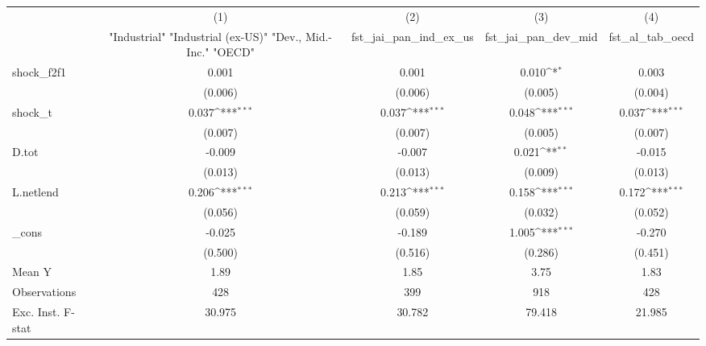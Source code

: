 {
\def\sym#1{\ifmmode^{#1}\else\(^{#1}\)\fi}
\begin{tabular}{l*{4}{c}}
\toprule
            &\multicolumn{1}{c}{(1)}&\multicolumn{1}{c}{(2)}&\multicolumn{1}{c}{(3)}&\multicolumn{1}{c}{(4)}\\
            &\multicolumn{1}{c}{ "Industrial" "Industrial (ex-US)" "Dev., Mid.-Inc." "OECD" }&\multicolumn{1}{c}{fst\_jai\_pan\_ind\_ex\_us}&\multicolumn{1}{c}{fst\_jai\_pan\_dev\_mid}&\multicolumn{1}{c}{fst\_al\_tab\_oecd}\\
\midrule
shock\_f2f1  &       0.001         &       0.001         &       0.010\sym{*}  &       0.003         \\
            &     (0.006)         &     (0.006)         &     (0.005)         &     (0.004)         \\
\addlinespace
shock\_t     &       0.037\sym{***}&       0.037\sym{***}&       0.048\sym{***}&       0.037\sym{***}\\
            &     (0.007)         &     (0.007)         &     (0.005)         &     (0.007)         \\
\addlinespace
D.tot       &      -0.009         &      -0.007         &       0.021\sym{**} &      -0.015         \\
            &     (0.013)         &     (0.013)         &     (0.009)         &     (0.013)         \\
\addlinespace
L.netlend   &       0.206\sym{***}&       0.213\sym{***}&       0.158\sym{***}&       0.172\sym{***}\\
            &     (0.056)         &     (0.059)         &     (0.032)         &     (0.052)         \\
\addlinespace
\_cons      &      -0.025         &      -0.189         &       1.005\sym{***}&      -0.270         \\
            &     (0.500)         &     (0.516)         &     (0.286)         &     (0.451)         \\
\midrule
Mean Y      &        1.89         &        1.85         &        3.75         &        1.83         \\
Observations&         428         &         399         &         918         &         428         \\
Exc. Inst. F-stat&      30.975         &      30.782         &      79.418         &      21.985         \\
\bottomrule
\end{tabular}
}

